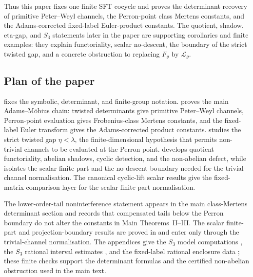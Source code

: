 \documentclass[11pt,a4paper]{amsart}
\theoremstyle{plain}
\theoremstyle{definition}
\theoremstyle{remark}
\begin{document}
Thus this paper fixes one finite SFT cocycle and proves the determinant
recovery of primitive Peter--Weyl channels, the Perron-point class Mertens
constants, and the Adams-corrected fixed-label Euler-product constants.  The
quotient, shadow, eta-gap, and \(S_3\) statements later in the paper are
supporting corollaries and finite examples: they explain functoriality, scalar
no-descent, the boundary of the strict twisted gap, and a concrete obstruction
to replacing \(F_\varrho\) by \(\mathcal L_\varrho\).
\subsection{Plan of the paper}

 fixes the symbolic, determinant, and finite-group
notation.   proves the main Adams--M\"obius chain: twisted
determinants give primitive Peter--Weyl channels, Perron-point evaluation gives
Frobenius-class Mertens constants, and the fixed-label Euler transform gives
the Adams-corrected product constants.   studies the strict
twisted gap \(\eta<\lambda\), the finite-dimensional hypothesis that permits
non-trivial channels to be evaluated at the Perron point.  
develops quotient functoriality, abelian shadows, cyclic detection, and the
non-abelian defect, while  isolates the scalar finite
part and the no-descent boundary needed for the trivial-channel normalisation.
The canonical cyclic-lift scalar results give the fixed-matrix comparison layer
for the scalar finite-part normalisation.

The lower-order-tail noninterference statement
 appears in the main
class-Mertens determinant section and records that compensated tails below the
Perron boundary do not alter the constants in Main Theorems~II--III.  The scalar
finite-part and projection-boundary results are proved in 
and enter only through the trivial-channel normalisation.  The appendices give
the \(S_3\) model computations , the \(S_3\)
rational interval estimates , and the fixed-label
rational enclosure data ; these
finite checks support the determinant formulas and the certified non-abelian
obstruction used in the main text.





\end{document}
